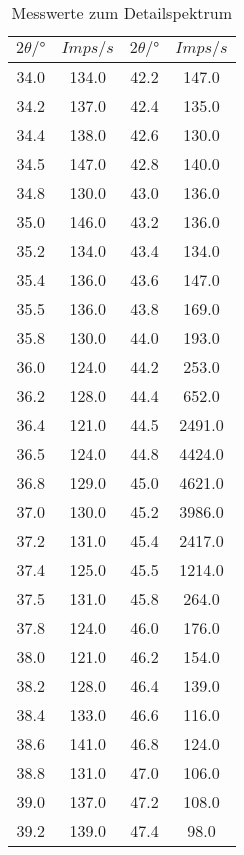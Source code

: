 \begin{table}[H]
    \centering
    \caption{Messwerte zum Detailspektrum}
    \label{tab:3}
    \begin{tabular}{c c c c }
        \toprule
        $2 \theta /° $ & $Imps/s$ & $2 \theta /°$ & $Imps/s$ \\
        \midrule
        34.0  & 	134.0   & 42.2  &	147.0  \\
        34.2  & 	137.0   & 42.4  &	135.0  \\
        34.4  & 	138.0   & 42.6  &	130.0  \\
        34.5  & 	147.0   & 42.8  &	140.0  \\
        34.8  & 	130.0   & 43.0  &	136.0  \\
        35.0  & 	146.0   & 43.2  &	136.0  \\
        35.2  & 	134.0   & 43.4  &	134.0  \\
        35.4  & 	136.0   & 43.6  &	147.0  \\
        35.5  & 	136.0   & 43.8  &	169.0  \\
        35.8  & 	130.0   & 44.0  &	193.0  \\
        36.0  & 	124.0   & 44.2  &	253.0  \\
        36.2  & 	128.0   & 44.4  &	652.0  \\
        36.4  & 	121.0   & 44.5  &	2491.0 \\
        36.5  & 	124.0   & 44.8  &	4424.0 \\
        36.8  & 	129.0   & 45.0  &	4621.0 \\
        37.0  & 	130.0   & 45.2  &	3986.0 \\
        37.2  & 	131.0   & 45.4  &	2417.0 \\
        37.4  & 	125.0   & 45.5  &	1214.0 \\
        37.5  & 	131.0   & 45.8  &	264.0  \\
        37.8  & 	124.0   & 46.0  &	176.0  \\
        38.0  & 	121.0   & 46.2  &	154.0  \\
        38.2  & 	128.0   & 46.4  &	139.0  \\
        38.4  & 	133.0   & 46.6  &	116.0  \\
        38.6  & 	141.0   & 46.8  &	124.0  \\
        38.8  & 	131.0   & 47.0  &	106.0  \\
        39.0  & 	137.0   & 47.2  &	108.0  \\
        39.2  & 	139.0   & 47.4  &	98.0  \\

\end{tabular}
\end{table}
